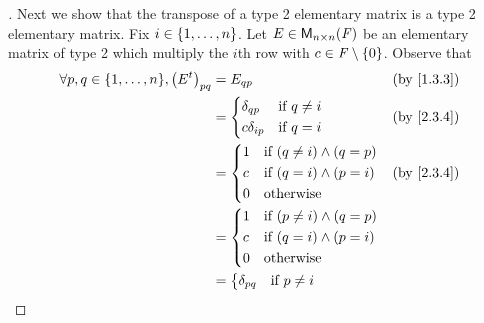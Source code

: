 \begin{proof}[]
  Next we show that the transpose of a type 2 elementary matrix is a type 2 elementary matrix.
  Fix \(i \in \left\lbrace1, \dots, n\right\rbrace\).
  Let \(E \in \ms[n][n][\F]\) be an elementary matrix of type 2 which multiply the \(i\)th row with \(c \in \mathit{F} \setminus \left\lbrace0\right\rbrace\).
  Observe that
  \begin{align*}
    \forall p, q \in \set{1, \dots, n}, \pa{\tp{E}}_{p q} & = E_{q p}                                  &  & \by{1.3.3} \\
                                                          & = \begin{dcases}
                                                                \delta_{q p}   & \text{if } q \neq i \\
                                                                c \delta_{i p} & \text{if } q = i
                                                              \end{dcases}    &  & \by{2.3.4}                     \\
                                                          & = \begin{dcases}
                                                                1 & \text{if } (q \neq i) \land (q = p) \\
                                                                c & \text{if } (q = i) \land (p = i)    \\
                                                                0 & \text{otherwise}
                                                              \end{dcases} &  & \by{2.3.4}                  \\
                                                          & = \begin{dcases}
                                                                1 & \text{if } (p \neq i) \land (q = p) \\
                                                                c & \text{if } (q = i) \land (p = i)    \\
                                                                0 & \text{otherwise}
                                                              \end{dcases}                  \\
                                                          & = \begin{dcases}
                                                                \delta_{p q}   & \text{if } p \neq i \\

\end{dcases}
\end{align*}
\end{proof}
